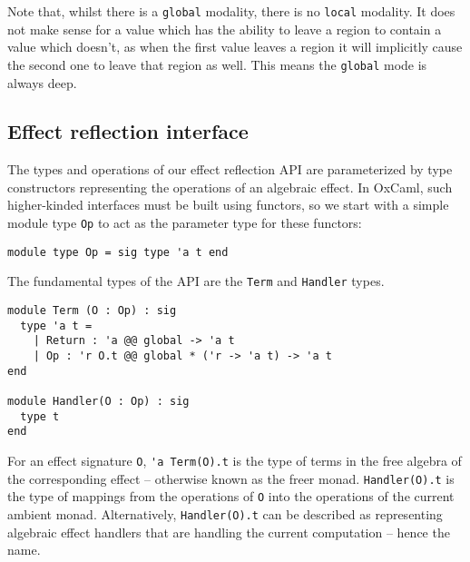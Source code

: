 \documentclass[acmsmall, screen, nonacm]{acmart}
\theoremstyle{definition}
\begin{document}
Note that, whilst there is a \lstinline[style=oxcaml]{global} modality,
there is no \lstinline[style=oxcaml]{local} modality. It does not make
sense for a value which has the ability to leave a region to contain a
value which doesn't, as when the first value leaves a region it will
implicitly cause the second one to leave that region as well. This means
the \lstinline[style=oxcaml]{global} mode is always deep.

\subsection{Effect reflection interface}
\label{sec:interface}

The types and operations of our effect reflection API are parameterized
by type constructors representing the operations of an algebraic
effect. In OxCaml, such higher-kinded interfaces must be built using
functors, so we start with a simple module type
\lstinline[style=oxcaml]{Op} to act as the parameter type for these
functors:
\begin{lstlisting}[style=oxcaml]
module type Op = sig type 'a t end
\end{lstlisting}
The fundamental types of the API are the \lstinline[style=oxcaml]{Term}
and \lstinline[style=oxcaml]{Handler} types.
\begin{lstlisting}[style=oxcaml]
module Term (O : Op) : sig
  type 'a t =
    | Return : 'a @@ global -> 'a t
    | Op : 'r O.t @@ global * ('r -> 'a t) -> 'a t
end

module Handler(O : Op) : sig
  type t
end
\end{lstlisting}
For an effect signature \lstinline[style=oxcaml]{O},
\lstinline[style=oxcaml]{'a Term(O).t} is the type of terms in the free
algebra of the corresponding effect -- otherwise known as the freer
monad\cite{??}. \lstinline[style=oxcaml]{Handler(O).t} is the type of
mappings from the operations of \lstinline[style=oxcaml]{O} into the
operations of the current ambient monad. Alternatively,
\lstinline[style=oxcaml]{Handler(O).t} can be described as representing
algebraic effect handlers that are handling the current computation --
hence the name.
\end{document}
